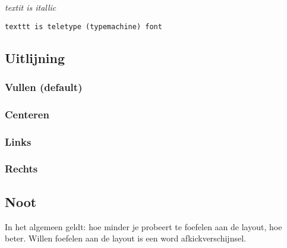 \documentclass{article} %
\begin{document}
			\textit{textit is itallic}
			
			\texttt{texttt is teletype (typemachine) font}
			
		\subsection{Uitlijning}
			\subsubsection{Vullen (default)}
				\begin{justify}
					\lipsum[][1-5]
				\end{justify}
	
			\subsubsection{Centeren}
				\begin{center}
					\lipsum[][1-5]
				\end{center}
				
			\subsubsection{Links}
				\begin{flushleft}
					\lipsum[][1-5]
				\end{flushleft}
			
			\subsubsection{Rechts} 
			
				\begin{flushright}
					\lipsum[][1-5]
				\end{flushright}
				
		\subsection*{Noot}
			\label{subsec:Noot}
			In het algemeen geldt: hoe minder je probeert te foefelen aan de layout, hoe beter. Willen foefelen aan de layout is een word afkickverschijnsel.
			
\end{document}
